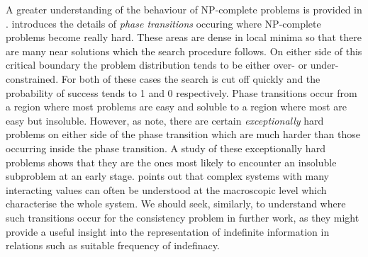 \medskip
{}
A greater understanding of the behaviour of NP-complete problems
is provided in \cite{slm92,msl92}.  \cite{ckt91} introduces
the details of {\em phase transitions} occuring where NP-complete
problems become really hard.  These areas are dense in local
minima so that there are many near solutions which the search procedure
follows.  On either side of this critical boundary the 
problem distribution tends to be either over- or under- constrained.
For both of these cases the search is cut off quickly and the 
probability of success tends to 1 and 0 respectively. Phase
transitions  occur from a region where
most problems are easy and soluble to a region where most are
easy but insoluble. However, as \cite{sg94} note, there are
certain {\em exceptionally} hard problems on either side
of the phase transition which are much harder than those occurring
inside the phase transition. A study of these exceptionally
hard problems shows that they are the ones most likely to
encounter an insoluble subproblem at an early stage. \cite{ckt91}
points out that complex systems with many
interacting values can often be understood at the
macroscopic level which characterise the whole system.
We should seek, similarly, 
to understand where such transitions occur for the consistency
problem in further work, as they might provide a useful insight into
the representation of indefinite information in relations such as
suitable frequency of indefinacy.


